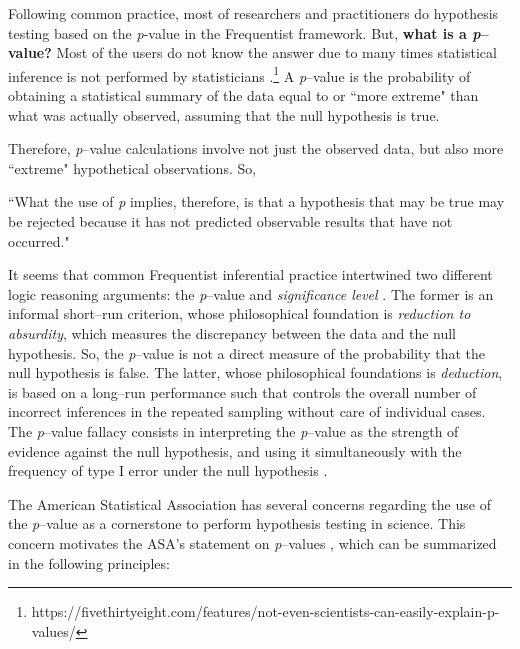 Following common practice, most of researchers and practitioners do hypothesis testing based on the \textit{p}-value in the Frequentist framework. But, \textbf{what is a \textit{p}--value?} Most of the users do not know the answer due to many times statistical inference is not performed by statisticians \cite{Berger2006}.\footnote{https://fivethirtyeight.com/features/not-even-scientists-can-easily-explain-p-values/} A \textit{p}--value is the probability of obtaining a statistical summary of the data equal to or ``more extreme" than what was actually observed, assuming that the null hypothesis is true.

Therefore, \textit{p}--value calculations involve not just the observed data, but also more ``extreme" hypothetical observations. So,

``What the use of \textit{p} implies, therefore, is that a hypothesis that may be true may be rejected because it has not predicted observable results that have not occurred."\cite{Jeffreys1961}

It seems that common Frequentist inferential practice intertwined two different logic reasoning arguments: the \textit{p}--value \cite{Fisher1958} and \textit{significance level} \cite{Neyman1933}. The former is an informal short--run criterion, whose philosophical foundation is \textit{reduction to absurdity}, which measures the discrepancy between the data and the null hypothesis. So, the \textit{p}--value is not a direct measure of the probability that the null hypothesis is false. The latter, whose philosophical foundations is \textit{deduction}, is based on a long--run performance such that controls the overall number of incorrect inferences in the repeated sampling without care of individual cases. The \textit{p}--value fallacy consists in interpreting the \textit{p}--value as the strength of evidence against the null hypothesis, and using it simultaneously with the frequency of type I error under the null hypothesis \cite{Goodman1999}.

The American Statistical Association has several concerns regarding the use of the \textit{p}--value as a cornerstone to perform hypothesis testing in science. This concern motivates the ASA's statement on \textit{p}--values \cite{Wasserstein2016}, which can be summarized in the following principles:

